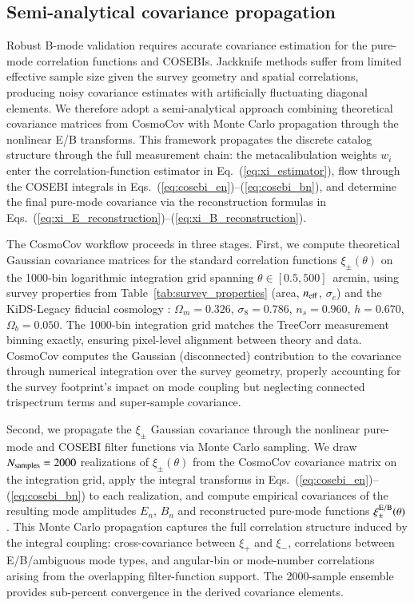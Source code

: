 \documentclass{aa}
\begin{document}
\subsection{Semi-analytical covariance propagation}
\label{sec:covariance}

Robust B-mode validation requires accurate covariance estimation for the pure-mode correlation functions and COSEBIs. Jackknife methods suffer from limited effective sample size given the survey geometry and spatial correlations, producing noisy covariance estimates with artificially fluctuating diagonal elements. We therefore adopt a semi-analytical approach combining theoretical covariance matrices from CosmoCov \citep{joachimi.etal21} with Monte Carlo propagation through the nonlinear E/B transforms. This framework propagates the discrete catalog structure through the full measurement chain: the metacalibulation weights $w_i$ enter the correlation-function estimator in Eq.~(\ref{eq:xi_estimator}), flow through the COSEBI integrals in Eqs.~(\ref{eq:cosebi_en})--(\ref{eq:cosebi_bn}), and determine the final pure-mode covariance via the reconstruction formulas in Eqs.~(\ref{eq:xi_E_reconstruction})--(\ref{eq:xi_B_reconstruction}).

The CosmoCov workflow proceeds in three stages. First, we compute theoretical Gaussian covariance matrices for the standard correlation functions $\xi_\pm(\theta)$ on the 1000-bin logarithmic integration grid spanning $\theta \in [0.5, 500]$~arcmin, using survey properties from Table~\ref{tab:survey_properties} (area, $n_{\rm eff}$, $\sigma_e$) and the KiDS-Legacy fiducial cosmology \citep{wright.etal25}: $\Omega_m = 0.326$, $\sigma_8 = 0.786$, $n_s = 0.960$, $h = 0.670$, $\Omega_b = 0.050$. The 1000-bin integration grid matches the TreeCorr measurement binning exactly, ensuring pixel-level alignment between theory and data. CosmoCov computes the Gaussian (disconnected) contribution to the covariance through numerical integration over the survey geometry, properly accounting for the survey footprint's impact on mode coupling but neglecting connected trispectrum terms and super-sample covariance.

Second, we propagate the $\xi_\pm$ Gaussian covariance through the nonlinear pure-mode and COSEBI filter functions via Monte Carlo sampling. We draw $N_{\rm samples} = 2000$ realizations of $\xi_\pm(\theta)$ from the CosmoCov covariance matrix on the integration grid, apply the integral transforms in Eqs.~(\ref{eq:cosebi_en})--(\ref{eq:cosebi_bn}) to each realization, and compute empirical covariances of the resulting mode amplitudes $E_n$, $B_n$ and reconstructed pure-mode functions $\xi_\pm^{\rm E/B}(\theta)$. This Monte Carlo propagation captures the full correlation structure induced by the integral coupling: cross-covariance between $\xi_+$ and $\xi_-$, correlations between E/B/ambiguous mode types, and angular-bin or mode-number correlations arising from the overlapping filter-function support. The 2000-sample ensemble provides sub-percent convergence in the derived covariance elements.
\end{document}
